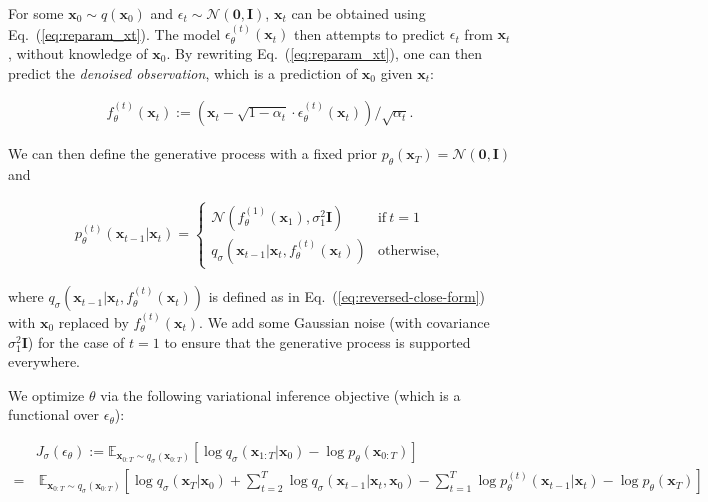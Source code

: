 For some ${\bm{x}}_0 \sim q({\bm{x}}_0)$ and $\epsilon_t \sim {\mathcal{N}}({\bm{0}}, {\bm{I}})$, 
${\bm{x}}_t$ can be obtained using Eq.~(\ref{eq:reparam_xt}). The model $\epsilon_\theta^{(t)}({\bm{x}}_t)$ then attempts to predict $\epsilon_t$ from ${\bm{x}}_t$, without knowledge of ${\bm{x}}_0$.
By rewriting Eq.~(\ref{eq:reparam_xt}), one can then predict the \textit{denoised observation}, which is a prediction of ${\bm{x}}_0$ given ${\bm{x}}_t$:

\begin{align}
    f_\theta^{(t)}({\bm{x}}_t) := ({\bm{x}}_t - \sqrt{1 - \alpha_t} \cdot \epsilon_{\theta}^{(t)}({\bm{x}}_t)) / \sqrt{\alpha_t}. \label{eq:x0-pred-def}
\end{align}

We can then define the generative process with a fixed prior $p_\theta({\bm{x}}_T) = {\mathcal{N}}({\bm{0}}, {\bm{I}})$ and

\begin{align}
    p_\theta^{(t)}({\bm{x}}_{t-1} | {\bm{x}}_t) = \begin{cases}
    {\mathcal{N}}(f_\theta^{(1)}({\bm{x}}_1), \sigma_1^2 {\bm{I}})  & \text{if} \ t = 1 \\
    q_\sigma({\bm{x}}_{t-1} | {\bm{x}}_t, f_{\theta}^{(t)}({\bm{x}}_t)) & \text{otherwise,}
    \end{cases} \label{eq:new-reverse}
\end{align}

where $q_\sigma({\bm{x}}_{t-1} | {\bm{x}}_t, f_{\theta}^{(t)}({\bm{x}}_t))$ is defined as in Eq.~(\ref{eq:reversed-close-form}) with ${\bm{x}}_0$ replaced by $f_{\theta}^{(t)}({\bm{x}}_t)$. 
We add some Gaussian noise (with covariance $\sigma_1^2 {\bm{I}}$) for the case of $t = 1$ to ensure that the generative process is supported everywhere. 

We optimize $\theta$ via the following variational inference objective (which is a functional over $\epsilon_\theta$):

\begin{align}
   & J_\sigma(\epsilon_\theta) :=
   {\mathbb{E}}_{{\bm{x}}_{0:T} \sim q_\sigma({\bm{x}}_{0:T})}[\log q_\sigma({\bm{x}}_{1:T} | {\bm{x}}_0) - \log p_\theta({\bm{x}}_{0:T})] \\
   = & \ {\mathbb{E}}_{{\bm{x}}_{0:T} \sim q_\sigma({\bm{x}}_{0:T})} \left[\log q_\sigma({\bm{x}}_T | {\bm{x}}_0) + \sum_{t=2}^{T} \log q_\sigma({\bm{x}}_{t-1} | {\bm{x}}_t, {\bm{x}}_0) - \sum_{t=1}^{T} \log p_\theta^{(t)}({\bm{x}}_{t-1} | {\bm{x}}_t) - \log p_\theta({\bm{x}}_T) \right] \nonumber
\end{align}

